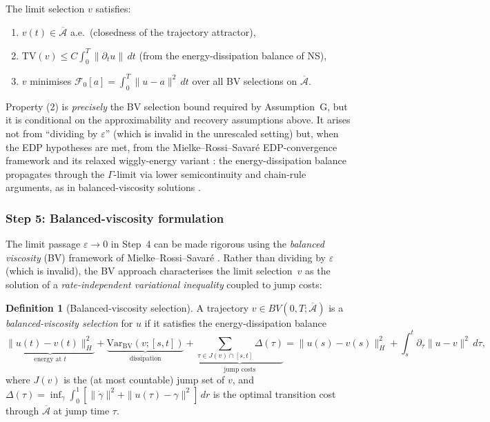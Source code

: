 \documentclass[12pt,a4paper]{article}
\theoremstyle{definition}
\newtheorem{definition}{Definition}[section]
\theoremstyle{plain}
\theoremstyle{remark}
\begin{document}
The limit selection $v$ satisfies:
\begin{enumerate}
\item $v(t) \in \overline{\mathcal{A}}$ a.e.\ (closedness of the trajectory attractor),
\item $\mathrm{TV}(v) \leq C \int_0^T \|\partial_t u\| \, dt$ (from the energy-dissipation balance of NS),
\item $v$ minimises $\mathcal{F}_0[a] = \int_0^T \|u - a\|^2\,dt$ over all BV selections on $\overline{\mathcal{A}}$.
\end{enumerate}
Property (2) is \emph{precisely} the BV selection bound required by Assumption~G, but it is conditional on the approximability and recovery assumptions above. It arises not from ``dividing by $\varepsilon$'' (which is invalid in the unrescaled setting) but, when the EDP hypotheses are met, from the Mielke--Rossi--Savar\'e EDP-convergence framework \cite{MielkeRossiSavare2016} and its relaxed wiggly-energy variant \cite{DondlFrenzelMielke2019}: the energy-dissipation balance propagates through the $\Gamma$-limit via lower semicontinuity and chain-rule arguments, as in balanced-viscosity solutions \cite{MielkeRossiSavare2016}.

\subsubsection*{Step 5: Balanced-viscosity formulation}

The limit passage $\varepsilon \to 0$ in Step~4 can be made rigorous using the \emph{balanced viscosity} (BV) framework of Mielke--Rossi--Savar\'e \cite{MielkeRossiSavare2016}. Rather than dividing by $\varepsilon$ (which is invalid), the BV approach characterises the limit selection~$v$ as the solution of a \emph{rate-independent variational inequality} coupled to jump costs:

\begin{definition}[Balanced-viscosity selection]\label{def:bv-selection}
A trajectory $v \in BV(0,T;\overline{\mathcal{A}})$ is a \emph{balanced-viscosity selection} for $u$ if it satisfies the energy-dissipation balance
\begin{equation}\label{eq:bv-edb}
  \underbrace{\|u(t) - v(t)\|_H^2}_{\text{energy at } t} + \underbrace{\mathrm{Var}_{\mathrm{BV}}(v;[s,t])}_{\text{dissipation}} + \underbrace{\sum_{\tau \in J(v) \cap [s,t]} \Delta(\tau)}_{\text{jump costs}} = \|u(s) - v(s)\|_H^2 + \int_s^t \partial_\tau \|u - v\|^2 \, d\tau,
\end{equation}
where $J(v)$ is the (at most countable) jump set of $v$, and $\Delta(\tau) = \inf_\gamma \int_0^1 [\|\dot\gamma\|^2 + \|u(\tau) - \gamma\|^2]\,dr$ is the optimal transition cost through $\overline{\mathcal{A}}$ at jump time $\tau$.
\end{definition}
\end{document}
